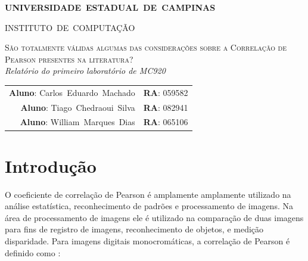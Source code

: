 \documentclass[10pt,a4paper]{article}
\begin{document}
\begin{titlepage}
\thispagestyle{empty}
  \begin{center} {\large \textbf{UNIVERSIDADE~ESTADUAL~DE~CAMPINAS}} \end{center}
  \begin{center} {\large INSTITUTO~DE~COMPUTAÇÃO}                    \end{center}
  \vspace{0.1cm}
  \begin{center}
  \begin{minipage}[tl]{31mm}
  \end{minipage}
  \end{center}
  \vspace{0.3cm}
  \begin{center} 
    {\large \textsc{São totalmente válidas algumas das considerações sobre a
Correlação de Pearson presentes na literatura?  }} 
    \\\vspace{0.5cm}
    {\textsl{Relatório do primeiro laboratório de MC920}}
    \\\vspace{1cm}
    \begin{tabular}{rl}
	  \textbf{Aluno}:   Carlos~Eduardo~Machado &  
	  \textbf{RA}:          059582 \\ 
	  \textbf{Aluno}:        Tiago~Chedraoui~Silva & 
	  \textbf{RA}:        082941 \\
	  \textbf{Aluno}:        William~Marques~Dias & 
	  \textbf{RA}:        065106 \\
	\end{tabular}
  \end{center}
  \vspace{0.5cm}

  \begin{abstract}
O coeficiente de correlação de Pearson é amplamente usado para
comparar imagens, contudo ele apresenta sérias limitações. Esse
trabalho consistiu na validação da análise realizada no Artigo ''The
Ineffectiveness of the Correlation Coefficient for Image Comparisons''.
  \end{abstract}
  \tableofcontents
\end{titlepage} 

\vspace{2mm}
\newpage

\section{Introdução}
O coeficiente de correlação de Pearson é amplamente amplamente
utilizado na análise estatística, reconhecimento de padrões e
processamento de imagens.
Na área de processamento de imagens ele é utilizado na comparação de
duas imagens para fins de registro de imagens, reconhecimento de
objetos, e medição disparidade. Para imagens digitais monocromáticas, a correlação de Pearson é definido como :
\end{document}
